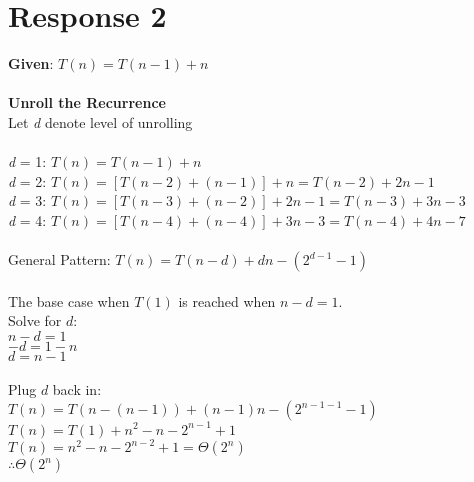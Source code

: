 \documentclass[12pt, a4paper]{article}
\begin{document}
\section*{\centering Response 2}
    \textbf{Given}: \(T(n) = T(n-1) + n\)\\
    \\
    \textbf{Unroll the Recurrence}\\
    Let \textit{d} denote level of unrolling\\
    \\
    \textit{d} = 1: \(T(n) = T(n-1) + n\)\\
    \textit{d} = 2: \(T(n) = [T(n-2) + (n-1)] + n = T(n-2) + 2n - 1\)\\
    \textit{d} = 3: \(T(n) = [T(n-3) + (n-2)] + 2n - 1 = T(n-3) + 3n - 3\)\\
    \textit{d} = 4: \(T(n) = [T(n-4) + (n-4)] + 3n - 3 = T(n-4) + 4n - 7\)\\
    \\
    General Pattern: \(T(n) = T(n-d) + dn - (2^{d-1} - 1)\)\\
    \\
    The base case when \(T(1)\) is reached when \(n-d = 1\).\\
    Solve for \(d\): \\
    \(n - d = 1\)\\
    \(-d = 1-n\)\\
    \(d=n-1\) \\
    \\
    Plug \(d\) back in:\\
    \(T(n)=T(n-(n-1))+(n-1)n-(2^{n-1-1}-1)\)\\
    \(T(n)=T(1)+n^2-n-2^{n-1}+1\)\\
    \(T(n)=n^2-n-2^{n-2}+1 = \Theta{(2^n)}\)\\
    \(\therefore \Theta{(2^n)}\)
    \newpage
\end{document}
